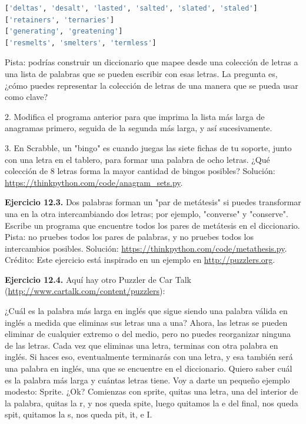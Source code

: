 \begin{lstlisting}[language=Python]
['deltas', 'desalt', 'lasted', 'salted', 'slated', 'staled']
['retainers', 'ternaries']
['generating', 'greatening']
['resmelts', 'smelters', 'termless']
\end{lstlisting}

Pista: podrías construir un diccionario que mapee desde una colección de letras a una lista de palabras que se pueden escribir con esas letras. La pregunta es, ¿cómo puedes representar la colección de letras de una manera que se pueda usar como clave?

2. Modifica el programa anterior para que imprima la lista más larga de anagramas primero, seguida de la segunda más larga, y así sucesivamente.

3. En Scrabble, un "bingo" es cuando juegas las siete fichas de tu soporte, junto con una letra en el tablero, para formar una palabra de ocho letras. ¿Qué colección de 8 letras forma la mayor cantidad de bingos posibles? Solución: \url{https://thinkpython.com/code/anagram_sets.py}.

\textbf{Ejercicio 12.3.} Dos palabras forman un "par de metátesis" si puedes transformar una en la otra intercambiando dos letras; por ejemplo, "converse" y "conserve". Escribe un programa que encuentre todos los pares de metátesis en el diccionario. Pista: no pruebes todos los pares de palabras, y no pruebes todos los intercambios posibles. Solución: \url{https://thinkpython.com/code/metathesis.py}. Crédito: Este ejercicio está inspirado en un ejemplo en \url{http://puzzlers.org}.

\textbf{Ejercicio 12.4.} Aquí hay otro Puzzler de Car Talk (\url{http://www.cartalk.com/content/puzzlers}):

¿Cuál es la palabra más larga en inglés que sigue siendo una palabra válida en inglés a medida que eliminas sus letras una a una? Ahora, las letras se pueden eliminar de cualquier extremo o del medio, pero no puedes reorganizar ninguna de las letras. Cada vez que eliminas una letra, terminas con otra palabra en inglés. Si haces eso, eventualmente terminarás con una letra, y esa también será una palabra en inglés, una que se encuentre en el diccionario. Quiero saber cuál es la palabra más larga y cuántas letras tiene. Voy a darte un pequeño ejemplo modesto: Sprite. ¿Ok? Comienzas con sprite, quitas una letra, una del interior de la palabra, quitas la r, y nos queda spite, luego quitamos la e del final, nos queda spit, quitamos la s, nos queda pit, it, e I.


